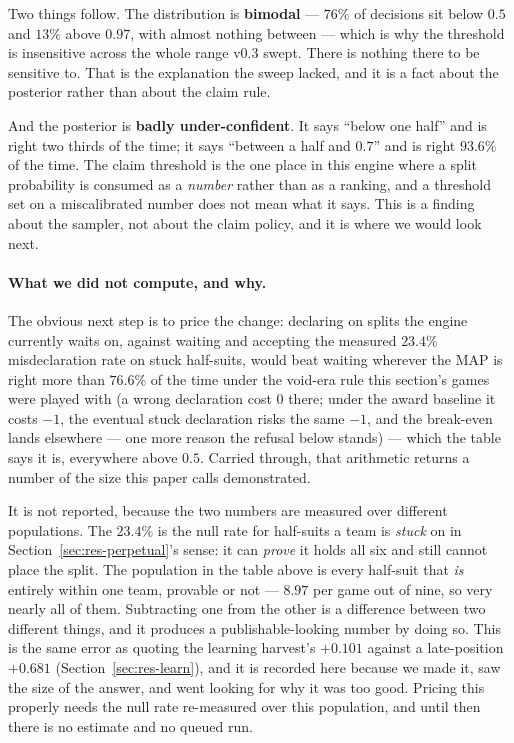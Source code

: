 \documentclass[11pt,a4paper]{article}
\begin{document}
Two things follow. The distribution is \textbf{bimodal} --- $76\%$ of decisions
sit below $0.5$ and $13\%$ above $0.97$, with almost nothing between --- which is
why the threshold is insensitive across the whole range v0.3 swept. There is
nothing there to be sensitive to. That is the explanation the sweep lacked, and
it is a fact about the posterior rather than about the claim rule.

And the posterior is \textbf{badly under-confident}. It says ``below one half''
and is right two thirds of the time; it says ``between a half and $0.7$'' and is
right $93.6\%$ of the time. The claim threshold is the one place in this engine
where a split probability is consumed as a \emph{number} rather than as a
ranking, and a threshold set on a miscalibrated number does not mean what it
says. This is a finding about the sampler, not about the claim policy, and it is
where we would look next.

\paragraph{What we did not compute, and why.} The obvious next step is to price
the change: declaring on splits the engine currently waits on, against waiting
and accepting the measured $23.4\%$ misdeclaration rate on stuck half-suits,
would beat waiting wherever the MAP is right more than $76.6\%$ of the time
under the void-era rule this section's games were played with (a wrong
declaration cost $0$ there; under the award baseline it costs $-1$, the
eventual stuck declaration risks the same $-1$, and the break-even lands
elsewhere --- one more reason the refusal below stands) --- which the
table says it is, everywhere above $0.5$. Carried through, that arithmetic
returns a number of the size this paper calls demonstrated.

It is not reported, because the two numbers are measured over different
populations. The $23.4\%$ is the null rate for half-suits a team is
\emph{stuck} on in Section~\ref{sec:res-perpetual}'s sense: it can \emph{prove}
it holds all six and still cannot place the split. The population in the table
above is every half-suit that \emph{is} entirely within one team, provable or
not --- $8.97$ per game out of nine, so very nearly all of them. Subtracting one
from the other is a difference between two different things, and it produces a
publishable-looking number by doing so. This is the same error as quoting the
learning harvest's $+0.101$ against a late-position $+0.681$
(Section~\ref{sec:res-learn}), and it is recorded here because we made it, saw
the size of the answer, and went looking for why it was too good. Pricing this
properly needs the null rate re-measured over this population, and until then
there is no estimate and no queued run.
\end{document}
